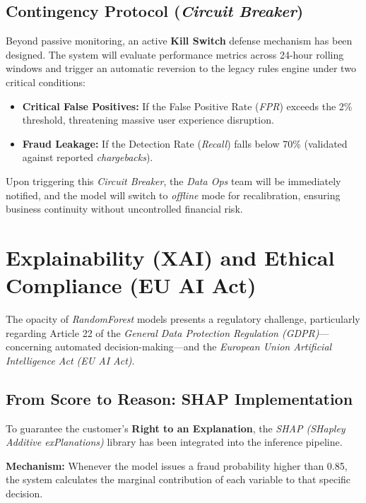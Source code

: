\documentclass[12pt,a4paper]{report}
\begin{document}
\subsection{Contingency Protocol (\textit{Circuit Breaker})}

Beyond passive monitoring, an active \textbf{Kill Switch} defense mechanism has been designed. The system will evaluate performance metrics across 24-hour rolling windows and trigger an automatic reversion to the legacy rules engine under two critical conditions:

\begin{itemize}
    \item \textbf{Critical False Positives:} If the False Positive Rate (\textit{FPR}) exceeds the 2\% threshold, threatening massive user experience disruption.
    \item \textbf{Fraud Leakage:} If the Detection Rate (\textit{Recall}) falls below 70\% (validated against reported \textit{chargebacks}).
\end{itemize}

Upon triggering this \textit{Circuit Breaker}, the \textit{Data Ops} team will be immediately notified, and the model will switch to \textit{offline} mode for recalibration, ensuring business continuity without uncontrolled financial risk.


\section{Explainability (XAI) and Ethical Compliance (EU AI Act)}

The opacity of \textit{RandomForest} models presents a regulatory challenge, particularly regarding Article 22 of the \textit{General Data Protection Regulation (GDPR)}—concerning automated decision-making—and the \textit{European Union Artificial Intelligence Act (EU AI Act)}.

\subsection{From Score to Reason: SHAP Implementation}

To guarantee the customer's \textbf{Right to an Explanation}, the \textit{SHAP (SHapley Additive exPlanations)} library has been integrated into the inference pipeline.

\textbf{Mechanism:}  
Whenever the model issues a fraud probability higher than 0.85, the system calculates the marginal contribution of each variable to that specific decision.
\end{document}
